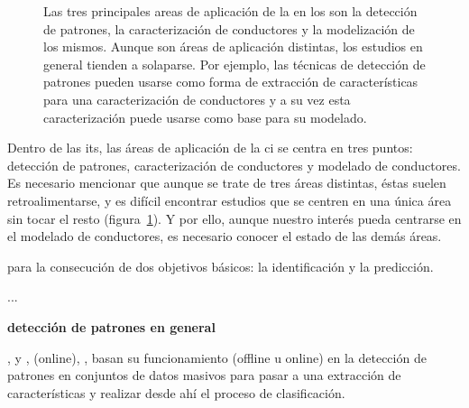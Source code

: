 \begin{figure}
	\centering
	\caption{Las tres principales areas de aplicación de la  en los  son la detección de patrones, la caracterización de conductores y la modelización de los mismos. Aunque son áreas de aplicación distintas, los estudios en general tienden a solaparse. Por ejemplo, las técnicas de detección de patrones pueden usarse como forma de extracción de características para una caracterización de conductores y a su vez esta caracterización puede usarse como base para su modelado.}
	\label{fig:three-main-applications-of-ci-in-its}
\end{figure}

Dentro de las \gls{its}, las áreas de aplicación de la \gls{ci} se centra en tres puntos: detección de patrones, caracterización de conductores y modelado de conductores. Es necesario mencionar que aunque se trate de tres áreas distintas, éstas suelen retroalimentarse, y es difícil encontrar estudios que se centren en una única área sin tocar el resto (figura~\ref{fig:three-main-applications-of-ci-in-its}). Y por ello, aunque nuestro interés pueda centrarse en el modelado de conductores, es necesario conocer el estado de las demás áreas.

 para la consecución de dos objetivos básicos: la identificación y la predicción.

...

\textbf{detección de patrones en general}

\cite{sekizawa2007modeling}, \cite{terada2010multi} y \cite{bando2013unsupervised}, \cite{maye2011bayesian} (online), \cite{johnson2011driving}, \cite{van2013driver} \cite{bender2015unsupervised} basan su funcionamiento (offline u online) en la detección de patrones en conjuntos de datos masivos para pasar a una extracción de características y realizar desde ahí el proceso de clasificación.

